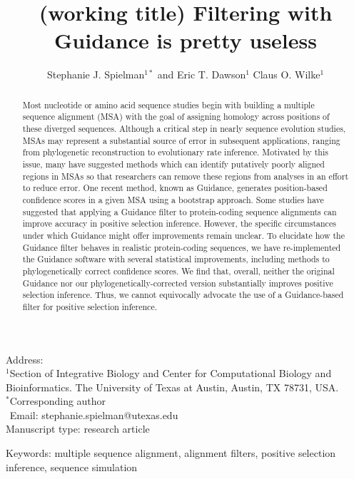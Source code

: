 \documentclass[10pt]{article}
\begin{document}
\title{\textbf{(working title) Filtering with Guidance is pretty useless}}
\author{Stephanie J. Spielman$^{1*}$ and Eric T. Dawson$^{1}$ Claus O. Wilke$^{1}$}
\date{}

\maketitle
\noindent
Address:\\
$^1$Section of Integrative Biology and Center for Computational Biology and Bioinformatics. The University
of Texas at Austin, Austin, TX 78731, USA.\\

\bigskip
\noindent
$^*$Corresponding author\\
$\phantom{^*}$Email: stephanie.spielman@utexas.edu\\

\bigskip
\noindent
Manuscript type: research article

\bigskip
\noindent Keywords: multiple sequence alignment, alignment filters, positive selection inference, sequence simulation

\newpage
\begin{abstract}
	Most nucleotide or amino acid sequence studies begin with building a multiple sequence alignment (MSA) with the goal of assigning homology across positions of these diverged sequences. Although a critical step in nearly sequence evolution studies, MSAs may represent a substantial source of error in subsequent applications, ranging from phylogenetic reconstruction to evolutionary rate inference. Motivated by this issue, many have suggested methods which can identify putatively poorly aligned regions in MSAs so that researchers can remove these regions from analyses in an effort to reduce error. One recent method, known as Guidance, generates position-based confidence scores in a given MSA using a bootstrap approach. Some studies have suggested that applying a Guidance filter to protein-coding sequence alignments can improve accuracy in positive selection inference. However, the specific circumstances under which Guidance might offer improvements remain unclear. To elucidate how the Guidance filter behaves in realistic protein-coding sequences, we have re-implemented the Guidance software with several statistical improvements, including methods to phylogenetically correct confidence scores. We find that, overall, neither the original Guidance nor our phylogenetically-corrected version substantially improves positive selection inference. Thus, we cannot equivocally advocate the use of a Guidance-based filter for positive selection inference.
\end{abstract}
\end{document}

